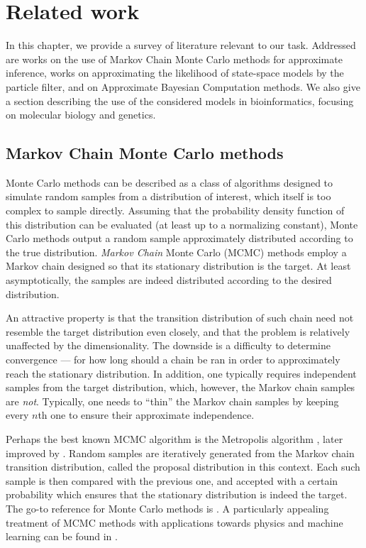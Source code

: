 \chapter{Related work}
\label{chap:related-work}

In this chapter, we provide a survey of literature relevant to our task. Addressed are works on the use of Markov Chain Monte Carlo methods for approximate inference, works on approximating the likelihood of state-space models by the particle filter, and on Approximate Bayesian Computation methods. We also give a section describing the use of the considered models in bioinformatics, focusing on molecular biology and genetics.

\section{Markov Chain Monte Carlo methods}
Monte Carlo methods can be described as a class of algorithms designed to simulate random samples from a distribution of interest, which itself is too complex to sample directly. Assuming that the probability density function of this distribution can be evaluated (at least up to a normalizing constant), Monte Carlo methods output a random sample approximately distributed according to the true distribution. \emph{Markov Chain} Monte Carlo (MCMC) methods employ a Markov chain designed so that its stationary distribution is the target. At least asymptotically, the samples are indeed distributed according to the desired distribution.

An attractive property is that the transition distribution of such chain need not resemble the target distribution even closely, and that the problem is relatively unaffected by the dimensionality. The downside is a difficulty to determine convergence --- for how long should a chain be ran in order to approximately reach the stationary distribution. In addition, one typically requires independent samples from the target distribution, which, however, the Markov chain samples are \emph{not}. Typically, one needs to ``thin'' the Markov chain samples by keeping every $n$th one to ensure their approximate independence.

Perhaps the best known MCMC algorithm is the Metropolis algorithm \citep{metropolis}, later improved by \cite{hastings}. Random samples are iteratively generated from the Markov chain transition distribution, called the proposal distribution in this context. Each such sample is then compared with the previous one, and accepted with a certain probability which ensures that the stationary distribution is indeed the target. The go-to reference for Monte Carlo methods is \cite{robert-casella}. A particularly appealing treatment of MCMC methods with applications towards physics and machine learning can be found in \cite{information-theory}.

